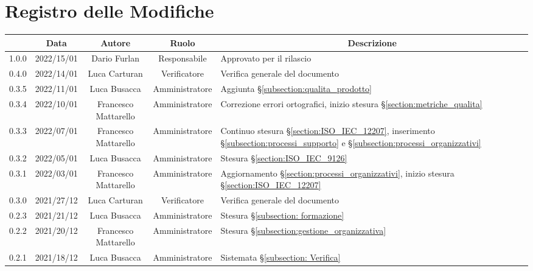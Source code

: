 \thispagestyle{empty}
\section*{Registro delle Modifiche}

\begin{center}
	\renewcommand{\arraystretch}{1.8}
	\begin{longtable}[c]{c | c | c | c | p{5cm}}
		\rowcolor[HTML]{125E28}
		\multicolumn{1}{c}{\color[HTML]{FFFFFF} \textbf{Versione}} & 
		\multicolumn{1}{c}{\color[HTML]{FFFFFF} \textbf{Data}} & 
		\multicolumn{1}{c}{\color[HTML]{FFFFFF} \textbf{Autore}} & 
		\multicolumn{1}{c}{\color[HTML]{FFFFFF} \textbf{Ruolo}} & 
		\multicolumn{1}{c}{\color[HTML]{FFFFFF} \textbf{Descrizione}} \\
		\endhead
1.0.0 & 2022/15/01 & Dario Furlan & Responsabile & Approvato per il rilascio\\
0.4.0 & 2022/14/01 & Luca Carturan & Verificatore & Verifica generale del documento\\ 
0.3.5 & 2022/11/01 & Luca Busacca & Amministratore & 
Aggiunta §\ref{subsection:qualita_prodotto}\\ 
0.3.4 & 2022/10/01 & Francesco Mattarello & Amministratore & Correzione errori ortografici, inizio stesura §\ref{section:metriche_qualita}\\
0.3.3 & 2022/07/01 & Francesco Mattarello & Amministratore & Continuo stesura §\ref{section:ISO_IEC_12207}, inserimento §\ref{subsection:processi_supporto} e §\ref{subsection:processi_organizzativi}\\
0.3.2 & 2022/05/01 & Luca Busacca & Amministratore & Stesura §\ref{section:ISO_IEC_9126}\\
0.3.1 & 2022/03/01 & Francesco Mattarello & Amministratore & Aggiornamento §\ref{section:processi_organizzativi}, inizio stesura §\ref{section:ISO_IEC_12207}\\
0.3.0 & 2021/27/12 & Luca Carturan & Verificatore & Verifica generale del documento\\
0.2.3 & 2021/21/12 & Luca Busacca & Amministratore & Stesura §\ref{subsection: formazione}\\
0.2.2 & 2021/20/12 & Francesco Mattarello & Amministratore & Stesura §\ref{subsection:gestione_organizzativa}\\
0.2.1 & 2021/18/12 & Luca Busacca & Amministratore & Sistemata §\ref{subsection: Verifica}\\

\end{longtable}
\end{center}
